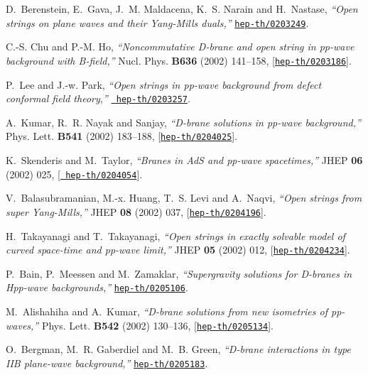 \documentclass[a4paper,12pt]{article}
\numberwithin{equation}{section}
\begin{document}
\begin{thebibliography}{10}
D.~Berenstein, E.~Gava, J.~M. Maldacena, K.~S. Narain and H.~Nastase, {\it
  ``Open strings on plane waves and their {Y}ang-{M}ills duals,''}
  \href{http://arXiv.org/abs/hep-th/0203249}{{\tt hep-th/0203249}}.

C.-S. Chu and P.-M. Ho, {\it ``Noncommutative {D}-brane and open string in
  pp-wave background with {B}-field,''}  Nucl. Phys. {\bf B636} (2002)
  141--158, [\href{http://arXiv.org/abs/hep-th/0203186}{{\tt hep-th/0203186}}].

P.~Lee and J.-w. Park, {\it ``Open strings in pp-wave background from defect
  conformal field theory,''}  \href{http://arXiv.org/abs/hep-th/0203257}{{\tt
  hep-th/0203257}}.

A.~Kumar, R.~R. Nayak and Sanjay, {\it ``{D}-brane solutions in pp-wave
  background,''}  Phys. Lett. {\bf B541} (2002) 183--188,
  [\href{http://arXiv.org/abs/hep-th/0204025}{{\tt hep-th/0204025}}].

K.~Skenderis and M.~Taylor, {\it ``Branes in {AdS} and pp-wave spacetimes,''}
  JHEP {\bf 06} (2002) 025, [\href{http://arXiv.org/abs/hep-th/0204054}{{\tt
  hep-th/0204054}}].

V.~Balasubramanian, M.-x. Huang, T.~S. Levi and A.~Naqvi, {\it ``Open strings
  from {\coordHE{}} super {Y}ang-{M}ills,''}  JHEP {\bf 08} (2002) 037,
  [\href{http://arXiv.org/abs/hep-th/0204196}{{\tt hep-th/0204196}}].

H.~Takayanagi and T.~Takayanagi, {\it ``Open strings in exactly solvable model
  of curved space-time and pp-wave limit,''}  JHEP {\bf 05} (2002) 012,
  [\href{http://arXiv.org/abs/hep-th/0204234}{{\tt hep-th/0204234}}].

P.~Bain, P.~Meessen and M.~Zamaklar, {\it ``Supergravity solutions for
  {D}-branes in {H}pp-wave backgrounds,''}
  \href{http://arXiv.org/abs/hep-th/0205106}{{\tt hep-th/0205106}}.

M.~Alishahiha and A.~Kumar, {\it ``{D}-brane solutions from new isometries of
  pp-waves,''}  Phys. Lett. {\bf B542} (2002) 130--136,
  [\href{http://arXiv.org/abs/hep-th/0205134}{{\tt hep-th/0205134}}].

O.~Bergman, M.~R. Gaberdiel and M.~B. Green, {\it ``{D}-brane interactions in
  type {IIB} plane-wave background,''}
  \href{http://arXiv.org/abs/hep-th/0205183}{{\tt hep-th/0205183}}.


\end{thebibliography}
\end{document}
